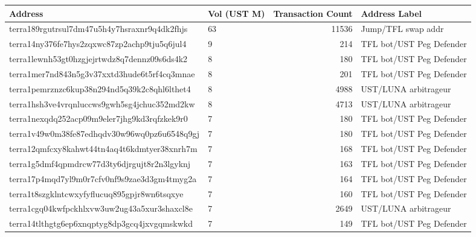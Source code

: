 
\begin{center}
    {\scriptsize
        \begin{tabular}{llrl}
            \toprule
            Address                                      & Vol (UST M) & Transaction Count & Address Label            \\
            \midrule
            terra189rgutrsul7dm47u5h4y7hsraxnr9q4dk2fhjs & 63          & 11536             & Jump/TFL swap addr       \\
            terra14ny376fe7hys2zqxwc87zp2achp9tju5q6jul4 & 9           & 214               & TFL bot/UST Peg Defender \\
            terra1lewnh53gt0hzgjejrtwdz8q7dennz09s6ds4k2 & 8           & 180               & TFL bot/UST Peg Defender \\
            terra1mer7nd843n5g3v37xxtd3hude6t5rf4cq3mnae & 8           & 201               & TFL bot/UST Peg Defender \\
            terra1pemrznzc6kup38n294nd5q39k2c8qhl6lthet4 & 8           & 4988              & UST/LUNA arbitrageur     \\
            terra1hsh3ve4vrqnluccws9gwh5sg4jchuc352md2kw & 8           & 4713              & UST/LUNA arbitrageur     \\
            terra1nexqdq252acp09m9eler7jhg9kd3rqfzkek9r0 & 7           & 180               & TFL bot/UST Peg Defender \\
            terra1v49w0m38fe87edhqdv30w96wq0pz6u6548q9gj & 7           & 180               & TFL bot/UST Peg Defender \\
            terra12qmfcxy8kahwt44tn4aq4t6kdmtyer38xnrh7m & 7           & 168               & TFL bot/UST Peg Defender \\
            terra1g5dmf4qpmdrcw77d3ty6djrgujt8r2n3lgyknj & 7           & 163               & TFL bot/UST Peg Defender \\
            terra17p4mqd7yl9m0r7cfv0nf9s9zae3d3gm4tmyg2a & 7           & 164               & TFL bot/UST Peg Defender \\
            terra1t8szgklntcwxyfyflucuq895gpjr8wn6tsqxye & 7           & 160               & TFL bot/UST Peg Defender \\
            terra1cgq04kwfpckhlxvw3uw2ug43a5xur3shaxcl8e & 7           & 2649              & UST/LUNA arbitrageur     \\
            terra14tlthgtg6ep6xnqptyg8dp3gcq4jxvgqmskwkd & 7           & 149               & TFL bot/UST Peg Defender \\

\end{tabular}}
\end{center}

